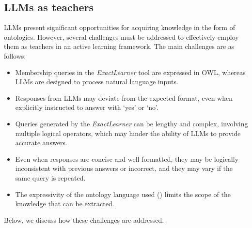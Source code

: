\subsection{\glspl{LLM} as teachers}
\label{subsec:probing}
%
\glspl{LLM} present significant opportunities for acquiring knowledge in the form of ontologies.
%
However, several challenges must be addressed to effectively employ them as teachers in an active learning framework.
%
The main challenges are as follows:
%
\begin{itemize}
    \item Membership queries in the \emph{ExactLearner} tool are expressed in \gls{OWL}, whereas \glspl{LLM} are designed to process natural language inputs.
    \item Responses from \glspl{LLM} may deviate from the expected format, even when explicitly instructed to answer with `yes' or `no'.
    \item Queries generated by the \emph{ExactLearner} can be lengthy and complex, involving multiple logical operators, which may hinder the ability of \glspl{LLM} to provide accurate answers.
    \item Even when responses are concise and well-formatted, they may be logically inconsistent with previous answers or incorrect, and they may vary if the same query is repeated.
    \item The expressivity of the ontology language used (\EL) limits the scope of the knowledge that can be extracted.
\end{itemize}
%
Below, we discuss how these challenges are addressed.



